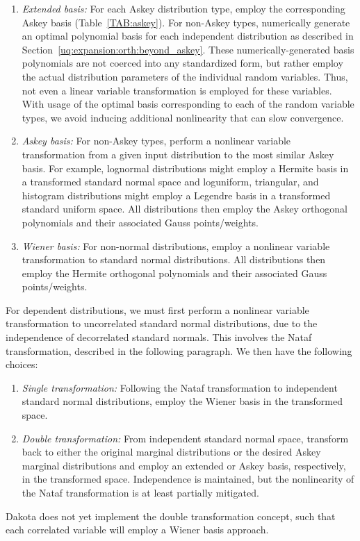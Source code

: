 \begin{enumerate}
\item {\it Extended basis:} For each Askey distribution type, employ
  the corresponding Askey basis (Table~\ref{TAB:askey}).  For
  non-Askey types, numerically generate an optimal polynomial basis
  for each independent distribution as described in
  Section~\ref{uq:expansion:orth:beyond_askey}.  These
  numerically-generated basis polynomials are not coerced into any
  standardized form, but rather employ the actual distribution
  parameters of the individual random variables.  Thus, not even a
  linear variable transformation is employed for these variables.
  With usage of the optimal basis corresponding to each of the random
  variable types, we %
  avoid inducing additional nonlinearity that can slow convergence.
\item {\it Askey basis:} For non-Askey types, perform a nonlinear
  variable transformation from a given input distribution to the most
  similar Askey basis.  For example, lognormal distributions might
  employ a Hermite basis in a transformed standard normal space and
  loguniform, triangular, and histogram distributions might employ a
  Legendre basis in a transformed standard uniform space.  All
  distributions then employ the Askey orthogonal polynomials and
  their associated Gauss points/weights.
\item {\it Wiener basis:} For non-normal distributions, employ a
  nonlinear variable transformation to standard normal distributions. 
  All distributions then employ the Hermite orthogonal polynomials 
  and their associated Gauss points/weights.
\end{enumerate}
For dependent distributions, we must first perform a nonlinear
variable transformation to uncorrelated standard normal distributions,
due to the independence of decorrelated standard normals.  This
involves the Nataf transformation, described in the following
paragraph.  We then have the following choices:
\begin{enumerate}
\item {\it Single transformation:} Following the Nataf transformation
  to independent standard normal distributions, employ the Wiener
  basis in the transformed space.
\item {\it Double transformation:} From independent standard normal
  space, transform back to either the original marginal distributions
  or the desired Askey marginal distributions and employ an extended
  or Askey basis, respectively, in the transformed space. Independence
  is maintained, but the nonlinearity of the Nataf transformation is
  at least partially mitigated.
\end{enumerate}
Dakota does not yet implement the double transformation concept, such
that each correlated variable will employ a Wiener basis approach.

